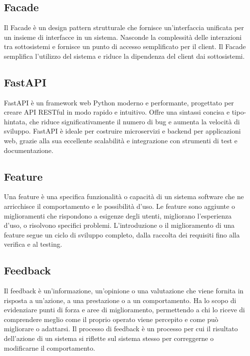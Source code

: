 
\section{}

\hypertarget{sec:facade}{}
\subsection*{Facade}
Il Facade è un design pattern strutturale che fornisce un'interfaccia unificata per un insieme di interfacce in un sistema. Nasconde la complessità
delle interazioni tra sottosistemi e fornisce un punto di accesso semplificato per il client. Il Facade semplifica l'utilizzo del sistema e riduce la
dipendenza del client dai sottosistemi.

\hypertarget{sec:fastapi}{}
\subsection*{FastAPI}
FastAPI è un framework web Python moderno e performante, progettato per creare API RESTful in modo rapido e intuitivo. Offre una sintassi 
concisa e tipo-hintata, che riduce significativamente il numero di bug e aumenta la velocità di sviluppo. FastAPI è ideale per 
costruire microservizi e backend per applicazioni web, grazie alla sua eccellente scalabilità e integrazione con strumenti di 
test e documentazione.

\hypertarget{sec:feature}{}
\subsection*{Feature}
Una feature è una specifica funzionalità o capacità di un sistema software che ne arricchisce il comportamento e le possibilità d'uso. Le feature sono 
aggiunte o miglioramenti che rispondono a esigenze degli utenti, migliorano l’esperienza d’uso, o risolvono specifici problemi. L'introduzione o il 
miglioramento di una feature segue un ciclo di sviluppo completo, dalla raccolta dei requisiti fino alla verifica e al testing.

\hypertarget{sec:feedback}{}
\subsection*{Feedback}
Il feedback è un'informazione, un'opinione o una valutazione che viene fornita in risposta a un'azione, a una prestazione o a un 
comportamento. Ha lo scopo di evidenziare punti di forza e aree di miglioramento, permettendo a chi lo riceve di comprendere meglio come il 
proprio operato viene percepito e come può migliorare o adattarsi. Il processo di feedback è un processo per cui il risultato dell’azione 
di un sistema si riflette sul sistema stesso per correggerne o modificarne il comportamento.

